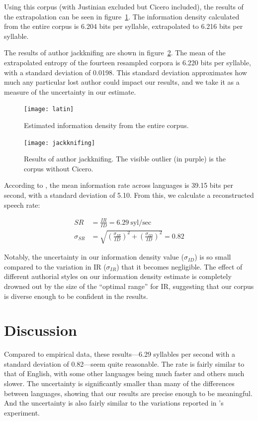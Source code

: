 \documentclass[12pt,twoside]{article}
\begin{document}
Using this corpus (with Justinian excluded but Cicero included), the results of the extrapolation can be seen in figure~\ref{fig:results}. The information density calculated from the entire corpus is 6.204 bits per syllable, extrapolated to 6.216 bits per syllable.

The results of author jackknifing are shown in figure~\ref{fig:jackknifing}. The mean of the extrapolated entropy of the fourteen resampled corpora is 6.220 bits per syllable, with a standard deviation of 0.0198. This standard deviation approximates how much any particular lost author could impact our results, and we take it as a measure of the uncertainty in our estimate.

\begin{figure}[h]
\centering
\noindent\texttt{[image: latin]}
\caption{Estimated information density from the entire corpus.}
\label{fig:results}
\end{figure}

\begin{figure}[h]
\centering
\noindent\texttt{[image: jackknifing]}
\caption{Results of author jackknifing. The visible outlier (in purple) is the corpus without Cicero.}
\label{fig:jackknifing}
\end{figure}

According to \citet{coupé}, the mean information rate across languages is 39.15 bits per second, with a standard deviation of 5.10. From this, we calculate a reconstructed speech rate:

\begin{align}
SR &= \frac{IR}{ID} = 6.29\:\textrm{syl/sec} \\
\sigma_{SR} &= \sqrt{\left(\frac{\sigma_{IR}}{ID}\right)^2 + \left(\frac{\sigma_{ID}}{ID}\right)^2} = 0.82
\end{align}

Notably, the uncertainty in our information density value (\(\sigma_{ID}\)) is so small compared to the variation in IR (\(\sigma_{IR}\)) that it becomes negligible. The effect of different authorial styles on our information density estimate is completely drowned out by the size of the ``optimal range'' for IR, suggesting that our corpus is diverse enough to be confident in the results.

\section{Discussion}
\label{sec:disc}

Compared to  empirical data, these results---6.29 syllables per second with a standard deviation of 0.82---seem quite reasonable. The rate is fairly similar to that of English, with some other languages being much faster and others much slower. The uncertainty is significantly smaller than many of the differences between languages, showing that our results are precise enough to be meaningful. And the uncertainty is also fairly similar to the variations reported in \citeauthor{coupé}'s experiment.
\end{document}
